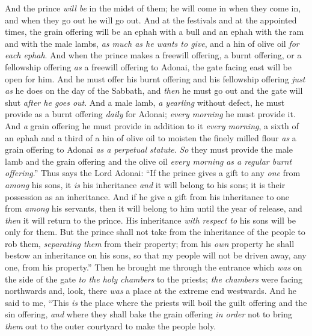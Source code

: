 \begin{biblechapter}
\verse And the prince \textit{will be} in the midst of them; he will come in when they come in, and when they go out he will go out.
\verse And at the festivals and at the appointed times, the grain offering will be an ephah with a bull and an ephah with the ram and with the male lambs, \textit{as much as he wants to give}, and a hin of olive oil \textit{for each ephah}.
\verse And when the prince makes a freewill offering, a burnt offering, or a fellowship offering \textit{as} a freewill offering to Adonai, the gate facing east will be open for him. And he must offer his burnt offering and his fellowship offering \textit{just as} he does on the day of the Sabbath, and \textit{then} he must go out and the gate will shut \textit{after he goes out}.
\verse And a male lamb, \textit{a yearling} without defect, he must provide as a burnt offering \textit{daily} for Adonai; \textit{every morning} he must provide it.
\verse And \textit{a} grain offering he must provide in addition to it \textit{every morning}, a sixth of an ephah and a third of a hin of olive oil to moisten the finely milled flour \textit{as} a grain offering to Adonai \textit{as a perpetual statute}.
\verse \textit{So} they must provide the male lamb and the grain offering and the olive oil \textit{every morning} \textit{as a regular burnt offering}.”
\verse Thus says the Lord Adonai: “If the prince gives a gift to any \textit{one} from \textit{among} his sons, it \textit{is} his inheritance \textit{and} it will belong to his sons; it is their possession as an inheritance.
\verse And if he give a gift from his inheritance to one from \textit{among} his servants, then it will belong to him until the year of release, and \textit{then} it will return to the prince. His inheritance \textit{with respect to} his sons will be only for them.
\verse But the prince shall not take from the inheritance of the people to rob them, \textit{separating them} from their property; from his \textit{own} property he shall bestow an inheritance on his sons, so that my people will not be driven away, any one, from his property.”
\verse Then he brought me through the entrance which \textit{was} on the side of the gate \textit{to the holy chambers} to the priests; \textit{the chambers} were facing northwards and, look, there \textit{was} a place at the extreme end westwards.
\verse And he said to me, “This \textit{is} the place where the priests will boil the guilt offering and the sin offering, \textit{and} where they shall bake the grain offering \textit{in order} not to bring \textit{them} out to the outer courtyard to make the people holy.

\end{biblechapter}
